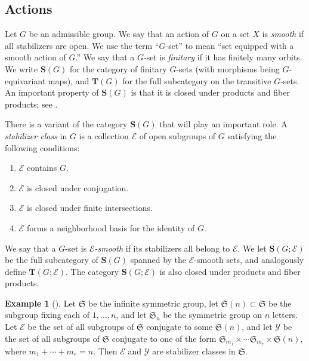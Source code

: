 \documentclass[12pt]{amsart}
\numberwithin{equation}{section}
\newtheorem{proposition}[equation]{Proposition}
\theoremstyle{definition}
\newtheorem{eg}[equation]{Example}
\newenvironment{example}[1][]{\begin{eg}[#1] \pushQED{\qed}}{\popQED \end{eg}}
\newcommand{\sE}{\mathscr{E}}
\newcommand{\bS}{\mathbf{S}}
\newcommand{\fS}{\mathfrak{S}}
\newcommand{\bT}{\mathbf{T}}
\newcommand{\sY}{\mathscr{Y}}
\newcommand{\defn}[1]{\emph{#1}}
\newcommand{\Set}{\mathbf{Set}}
\begin{document}
\subsection{Actions}

Let $G$ be an admissible group. We say that an action of $G$ on a set $X$ is \defn{smooth} if all stabilizers are open. We use the term ``$G$-set'' to mean ``set equipped with a smooth action of $G$.'' We say that a $G$-set is \defn{finitary} if it has finitely many orbits. We write $\bS(G)$ for the category of finitary $G$-sets (with morphisms being $G$-equivariant maps), and $\bT(G)$ for the full subcategory on the transitive $G$-sets. An important property of $\bS(G)$ is that it is closed under products and fiber products; see \cite[\S 2.3]{repst}.

%


There is a variant of the category $\bS(G)$ that will play an important role. A \defn{stabilizer class} in $G$ is a collection $\sE$ of open subgroups of $G$ satisfying the following conditions:
\begin{enumerate}
\item $\sE$ contains $G$.
\item $\sE$ is closed under conjugation.
\item $\sE$ is closed under finite intersections.
\item $\sE$ forms a neighborhood basis for the identity of $G$.
\end{enumerate}
We say that a $G$-set is \defn{$\sE$-smooth} if its stabilizers all belong to $\sE$. We let $\bS(G; \sE)$ be the full subcategory of $\bS(G)$ spanned by the $\sE$-smooth sets, and analogously define $\bT(G; \sE)$. The category $\bS(G; \sE)$ is also closed under products and fiber products.

\begin{example} \label{ex:sym-stab-class}
Let $\fS$ be the infinite symmetric group, let $\fS(n) \subset \fS$ be the subgroup fixing each of $1, \ldots, n$, and let $\fS_n$ be the symmetric group on $n$ letters. Let $\sE$ be the set of all subgroups of $\fS$ conjugate to some $\fS(n)$, and let $\sY$ be the set of all subgroups of $\fS$ conjugate to one of the form $\fS_{m_1} \times \cdots \fS_{m_r} \times \fS(n)$, where $m_1+\cdots+m_r=n$. Then $\sE$ and $\sY$ are stabilizer classes in $\fS$.
\end{example}
\end{document}
